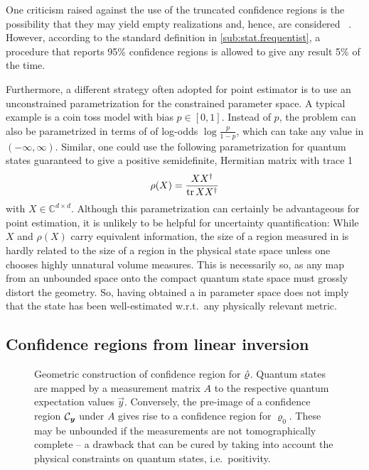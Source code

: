 One criticism raised against the use of the truncated confidence regions is the possibility that they may yield empty realizations and, hence, are considered ~\cite{Feldman_1998_Unified}.
However, according to the standard definition in \cref{sub:stat.frequentist}, a procedure that reports 95\% confidence regions is allowed to give any result 5\% of the time.

Furthermore, a different strategy often adopted for point estimator is to use an unconstrained parametrization for the constrained parameter space.
A typical example is a coin toss model with bias $p \in [0, 1]$.
Instead of $p$, the problem can also be parametrized in terms of of log-odds $\log\frac{p}{1 - p}$, which can take any value in $(-\infty,\infty)$.
Similar, one could use the following parametrization for quantum states guaranteed to give a positive semidefinite, Hermitian matrix with trace 1
\[
  \rho(X) = \frac{X {{X}^\dagger}}{\operatorname{tr} X {{X}^\dagger}}
\]
with $X \in \mathbb{C}^{d \times d}$.
Although this parametrization can certainly be advantageous for point estimation, it is unlikely to be helpful for uncertainty quantification:
While $X$ and $\rho(X)$ carry equivalent information, the size of a region measured in  is hardly related to the size of a region in the physical state space unless one chooses highly unnatural volume measures.
This is necessarily so, as any map from an unbounded space onto the compact quantum state space must grossly distort the geometry.
So, having obtained a  in parameter space does not imply that the state has been well-estimated w.r.t.\ any physically relevant metric.

\subsection{Confidence regions from linear inversion}
\label{sub:ortho.linear_inversion}

\begin{figure*}
  \centering
  \caption{\label{fig:ortho.geometry}%
    Geometric construction of confidence region for $\hat{\varrho}$.
    Quantum states are mapped by a measurement matrix $A$ to the respective quantum expectation values $\vec y$.
    Conversely, the pre-image of a confidence region $\mathcal{C}_{\boldsymbol{y}}$ under $A$ gives rise to a confidence region for $\varrho_0$.
    These may be unbounded if the measurements are not tomographically complete -- a drawback that can be cured by taking into account the physical constraints on quantum states, i.e.\ positivity.
  }
\end{figure*}


